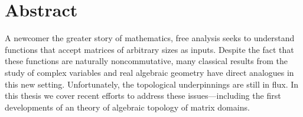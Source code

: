\begingroup
\let\clearpage\relax
\let\cleardoublepage\relax
\let\cleardoublepage\relax

\chapter*{Abstract}
A newcomer the greater story of mathematics, free analysis seeks to understand
functions that accept matrices of arbitrary sizes as inputs. Despite the fact
that these functions are naturally noncommutative, many classical results from
the study of complex variables and real algebraic geometry have direct analogues
in this new setting. Unfortunately, the topological underpinnings are still in
flux. In this thesis we cover recent efforts to address these issues---including
the first developments of an theory of algebraic topology of matrix domains.



\vfill
\endgroup

\vfill
